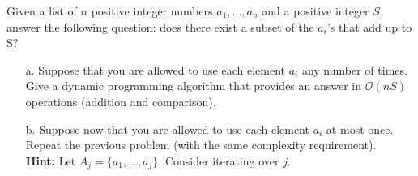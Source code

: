 Given a list  of $n$ positive integer numbers $a_1,\dots,a_n$ and a positive integer $S$, answer the following question: does there exist a subset of the $a_i$'s that add up to S?
\begin{itemize}
\item[a.] Suppose that you are allowed to use each element $a_i$ any number of times. Give a dynamic programming algorithm that provides an answer in $\mathcal{O}(nS)$ operations (addition and comparison).
\item[b.] Suppose now that you are allowed to use each element $a_i$ at most once. Repeat the previous problem (with the same complexity requirement). \\
    \textbf{Hint:} Let $A_j = \{ a_1,\dots,a_j\}$. Consider iterating over $j$.
\end{itemize}

